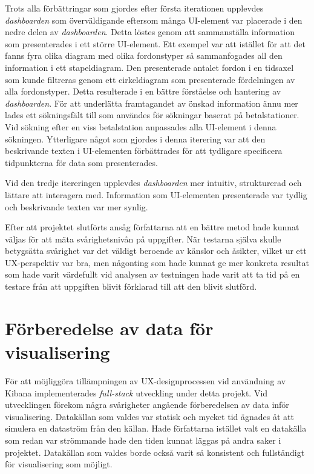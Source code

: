 \documentclass[12pt]{kththesis}
\begin{document}
Trots alla förbättringar som gjordes efter första iterationen upplevdes \textit{dashboarden} som överväldigande eftersom många UI-element var placerade i den nedre delen av \textit{dashboarden}. Detta löstes genom att sammanställa information som presenterades i ett större UI-element. Ett exempel var att istället för att det fanns fyra olika diagram med olika fordonstyper så sammanfogades all den information i ett stapeldiagram. Den presenterade antalet fordon i en tidsaxel som kunde filtreras genom ett cirkeldiagram som presenterade fördelningen av alla fordonstyper. Detta resulterade i en bättre förståelse och hantering av \textit{dashboarden}. För att underlätta framtagandet av önskad information ännu mer lades ett sökningsfält till som användes för sökningar baserat på betalstationer. Vid sökning efter en viss betalstation anpassades alla UI-element i denna sökningen. Ytterligare något som gjordes i denna iterering var att den beskrivande texten i UI-elementen förbättrades för att tydligare specificera tidpunkterna för data som presenterades. 

Vid den tredje itereringen upplevdes \textit{dashboarden} mer intuitiv, strukturerad och lättare att interagera med. Information som UI-elementen presenterade var tydlig och beskrivande texten var mer synlig. 

Efter att projektet slutförts ansåg författarna att en bättre metod hade kunnat väljas för att mäta svårighetsnivån på uppgifter. När testarna själva skulle betygsätta svårighet var det väldigt beroende av känslor och åsikter, vilket ur ett UX-perspektiv var bra, men någonting som hade kunnat ge mer konkreta resultat som hade varit värdefullt vid analysen av testningen hade varit att ta tid på en testare från att uppgiften blivit förklarad till att den blivit slutförd. 

\section{Förberedelse av data för visualisering}
För att möjliggöra tillämpningen av UX-designprocessen vid användning av Kibana implementerades \textit{full-stack} utveckling under detta projekt. Vid utvecklingen förekom några svårigheter angående förberedelsen av data inför visualisering. Datakällan som valdes var statisk och mycket tid ägnades åt att simulera en dataström från den källan. Hade författarna istället valt en datakälla som redan var strömmande hade den tiden kunnat läggas på andra saker i projektet. Datakällan som valdes borde också varit så konsistent och fullständigt för visualisering som möjligt. 
\end{document}
